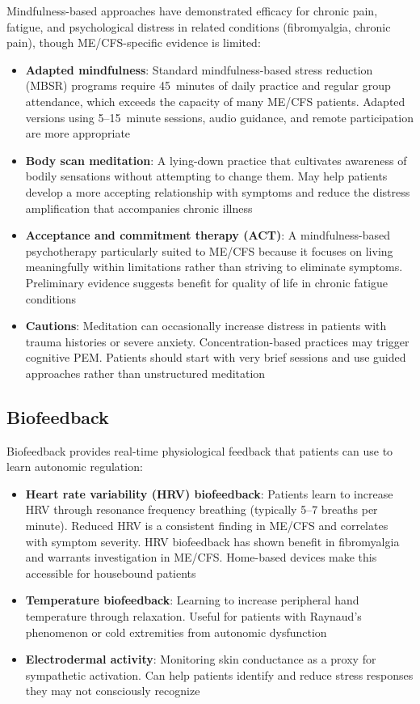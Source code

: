 Mindfulness-based approaches have demonstrated efficacy for chronic pain, fatigue, and psychological distress in related conditions (fibromyalgia, chronic pain), though ME/CFS-specific evidence is limited:

\begin{itemize}
    \item \textbf{Adapted mindfulness}: Standard mindfulness-based stress reduction (MBSR) programs require 45~minutes of daily practice and regular group attendance, which exceeds the capacity of many ME/CFS patients. Adapted versions using 5--15~minute sessions, audio guidance, and remote participation are more appropriate
    \item \textbf{Body scan meditation}: A lying-down practice that cultivates awareness of bodily sensations without attempting to change them. May help patients develop a more accepting relationship with symptoms and reduce the distress amplification that accompanies chronic illness
    \item \textbf{Acceptance and commitment therapy (ACT)}: A mindfulness-based psychotherapy particularly suited to ME/CFS because it focuses on living meaningfully within limitations rather than striving to eliminate symptoms. Preliminary evidence suggests benefit for quality of life in chronic fatigue conditions
    \item \textbf{Cautions}: Meditation can occasionally increase distress in patients with trauma histories or severe anxiety. Concentration-based practices may trigger cognitive PEM. Patients should start with very brief sessions and use guided approaches rather than unstructured meditation
\end{itemize}

\subsection{Biofeedback}

Biofeedback provides real-time physiological feedback that patients can use to learn autonomic regulation:

\begin{itemize}
    \item \textbf{Heart rate variability (HRV) biofeedback}: Patients learn to increase HRV through resonance frequency breathing (typically 5--7 breaths per minute). Reduced HRV is a consistent finding in ME/CFS and correlates with symptom severity. HRV biofeedback has shown benefit in fibromyalgia and warrants investigation in ME/CFS. Home-based devices make this accessible for housebound patients
    \item \textbf{Temperature biofeedback}: Learning to increase peripheral hand temperature through relaxation. Useful for patients with Raynaud's phenomenon or cold extremities from autonomic dysfunction
    \item \textbf{Electrodermal activity}: Monitoring skin conductance as a proxy for sympathetic activation. Can help patients identify and reduce stress responses they may not consciously recognize
\end{itemize}

